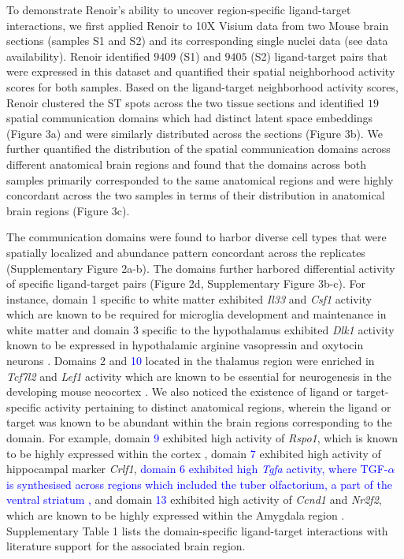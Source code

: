 To demonstrate Renoir's ability to uncover region-specific ligand-target interactions, we first applied Renoir to 10X Visium data from two Mouse brain sections (samples S1 and S2) and its corresponding single nuclei data \citep{Kleshchevnikov2022} (see data availability). Renoir identified $9409$ (S1) and $9405$ (S2) ligand-target pairs that were expressed in this dataset and quantified their spatial neighborhood activity scores for both samples. Based on the ligand-target neighborhood activity scores, Renoir clustered the ST spots across the two tissue sections and identified $19$ spatial communication domains which had distinct latent space embeddings (Figure 3a) and were similarly distributed across the sections (Figure 3b). We further quantified the distribution of the spatial communication domains across different anatomical brain regions and found that the domains across both samples primarily corresponded to the same anatomical regions and were highly concordant across the two samples in terms of their distribution in anatomical brain regions (Figure 3c).\par

The communication domains were found to harbor diverse cell types that were spatially localized and abundance pattern concordant across the replicates (Supplementary Figure 2a-b). The domains further harbored differential activity of specific ligand-target pairs (Figure 2d, Supplementary Figure 3b-c). For instance, domain 1 specific to white matter exhibited \textit{Il33} and \textit{Csf1} activity which are known to be required for microglia development and maintenance in white matter \citep{10.3389/fimmu.2019.02199, 10.3389/fimmu.2018.02596} and domain 3 specific to the hypothalamus exhibited \textit{Dlk1} activity known to be expressed in hypothalamic arginine vasopressin and oxytocin neurons \citep{10.1371/journal.pone.0036134}. Domains 2 and \textcolor{blue}{10} located in the thalamus region were enriched in \textit{Tcf7l2} and \textit{Lef1} activity which are known to be essential for neurogenesis in the developing mouse neocortex \citep{Chodelkova2018, Nagalski2013}. We also noticed the existence of ligand or target-specific activity pertaining to distinct anatomical regions, wherein the ligand or target was known to be abundant within the brain regions corresponding to the domain. For example, domain \textcolor{blue}{9} exhibited high activity of \textit{Rspo1}, which is known to be highly expressed within the cortex \citep{10.1210/en.2013-1550, Miller2019}, domain \textcolor{blue}{7} exhibited high activity of hippocampal marker \textit{Crlf1}, \textcolor{blue}{domain 6 exhibited high \textit{Tgfa} activity, where TGF-$\alpha$ is synthesised across regions which included the tuber olfactorium, a part of the ventral striatum \citep{Wilcox1901},} and domain \textcolor{blue}{13} exhibited high activity of \textit{Ccnd1} and \textit{Nr2f2}, which are known to be highly expressed within the Amygdala region \citep{KOELLER2008230, 10.1242/dev.075564}. Supplementary Table 1 lists the domain-specific ligand-target interactions with literature support for the associated brain region. 


